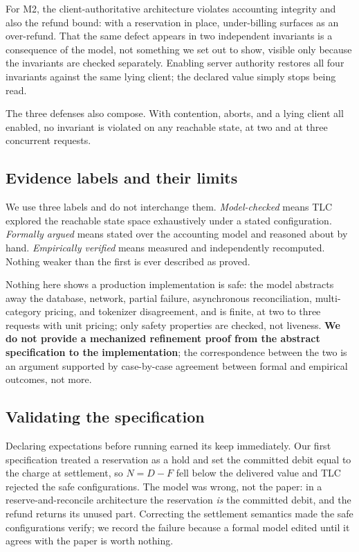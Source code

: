 \documentclass[manuscript,review,anonymous]{acmart}
\begin{document}
For M2, the client-authoritative architecture violates accounting integrity and also the
refund bound: with a reservation in place, under-billing surfaces as an over-refund. That
the same defect appears in two independent invariants is a consequence of the model, not
something we set out to show, visible only because the invariants are checked
separately. Enabling server authority restores all four invariants
against the same lying client; the declared value simply stops being read.

The three defenses also compose. With contention, aborts, and a lying client all enabled,
no invariant is violated on any reachable state, at two and at three concurrent requests.

\subsection{Evidence labels and their limits}
We use three labels and do not interchange them. \emph{Model-checked} means TLC explored
the reachable state space exhaustively under a stated configuration. \emph{Formally
argued} means stated over the accounting model and reasoned about by hand.
\emph{Empirically verified} means measured and independently recomputed. Nothing weaker
than the first is ever described as proved.

Nothing here shows a production implementation is safe: the model abstracts away the
database, network, partial failure, asynchronous reconciliation, multi-category pricing,
and tokenizer disagreement, and is finite, at two to three requests with unit pricing;
only safety properties are checked, not liveness. \textbf{We
do not provide a mechanized refinement proof from the abstract specification to the
implementation}; the correspondence between the two is an argument supported by
case-by-case agreement between formal and empirical outcomes, not more.

\subsection{Validating the specification}
Declaring expectations before running earned its keep immediately. Our first
specification treated a reservation as a hold and set the committed debit equal to the
charge at settlement, so $N = D - F$ fell below the delivered value and TLC rejected the
safe configurations. The model was wrong, not the paper: in a reserve-and-reconcile
architecture the reservation \emph{is} the committed debit, and the refund returns its
unused part. Correcting the settlement semantics made the safe configurations verify; we record the
failure because a formal model edited until it agrees with the paper is worth nothing.
\end{document}
